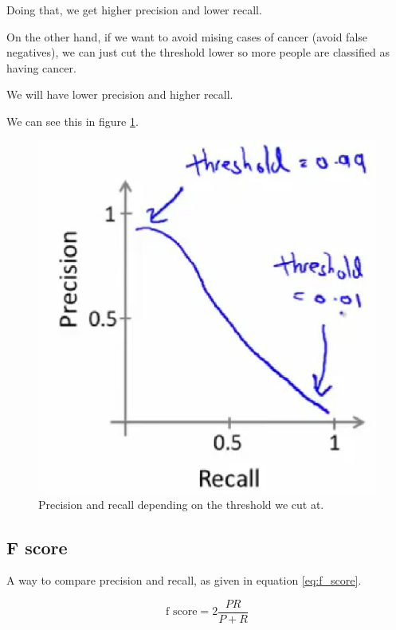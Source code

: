 \documentclass[11pt]{extarticle}
\begin{document}
Doing that, we get higher precision and lower recall. \bigskip

On the other hand, if we want to avoid mising cases of cancer (avoid
false negatives), we can just cut the threshold lower so more people are
classified as having cancer.

We will have lower precision and higher recall. \bigskip

We can see this in figure \ref{fig:precision_recall_threshold}.

\begin{figure}
\centering
\includegraphics[width=\textwidth]{img/precision_recall_threshold.eps}
\caption{Precision and recall depending on the threshold we cut at.}
\label{fig:precision_recall_threshold}
\end{figure}

\subsection{F score}\label{f-score}

A way to compare precision and recall, as given in equation
\ref{eq:f_score}.

\begin{equation} \label{eq:f_score}
\text{f score} = 2 \frac{PR}{P+R}
\end{equation}
\end{document}
